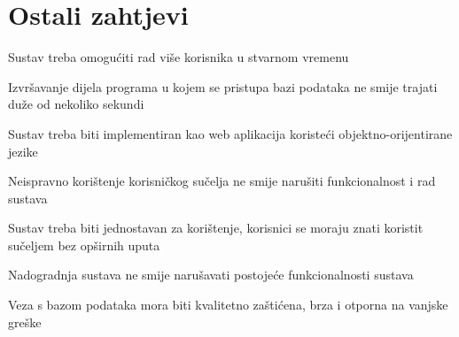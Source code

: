 				\eject
	
		\section{Ostali zahtjevi}
		 
			 \begin{packed_item}
			 \item  Sustav treba omogućiti rad više korisnika u stvarnom vremenu
			 \item Izvršavanje dijela programa u kojem se pristupa bazi podataka ne smije trajati duže od nekoliko sekundi
			 \item Sustav treba biti implementiran kao web aplikacija koristeći objektno-orijentirane jezike
			 \item Neispravno korištenje korisničkog sučelja ne smije narušiti funkcionalnost i rad sustava
			 \item Sustav treba biti jednostavan za korištenje, korisnici se moraju znati koristit sučeljem bez opširnih uputa
			 \item Nadogradnja sustava ne smije narušavati postojeće funkcionalnosti sustava
			 \item Veza s bazom podataka mora biti kvalitetno zaštićena, brza i otporna na vanjske greške
			 \end{packed_item}
	